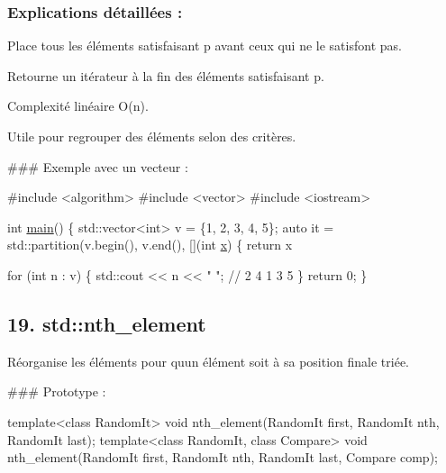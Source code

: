 \subsubsection*{Explications détaillées \+:}


\begin{DoxyItemize}
\item Place tous les éléments satisfaisant {\ttfamily p} avant ceux qui ne le satisfont pas.
\item Retourne un itérateur à la fin des éléments satisfaisant {\ttfamily p}.
\item Complexité linéaire O(n).
\item Utile pour regrouper des éléments selon des critères.
\end{DoxyItemize}

\#\#\# Exemple avec un vecteur \+: 
\begin{DoxyCode}
\textcolor{preprocessor}{#include <algorithm>}
\textcolor{preprocessor}{#include <vector>}
\textcolor{preprocessor}{#include <iostream>}

\textcolor{keywordtype}{int} \hyperlink{htop_8c_a3c04138a5bfe5d72780bb7e82a18e627}{main}() \{
    std::vector<int> v = \{1, 2, 3, 4, 5\};
    \textcolor{keyword}{auto} it = std::partition(v.begin(), v.end(), [](\textcolor{keywordtype}{int} \hyperlink{addition_8c_a6150e0515f7202e2fb518f7206ed97dc}{x}) \{ \textcolor{keywordflow}{return} x %

    \textcolor{keywordflow}{for} (\textcolor{keywordtype}{int} n : v) \{
        std::cout << n << \textcolor{stringliteral}{" "}; \textcolor{comment}{// 2 4 1 3 5}
    \}
    \textcolor{keywordflow}{return} 0;
\}
\end{DoxyCode}
 



\subsection*{19. {\bfseries std\+::nth\+\_\+element}}

Réorganise les éléments pour qu\textquotesingle{}un élément soit à sa position finale triée.

\#\#\# Prototype \+: 
\begin{DoxyCode}
\textcolor{keyword}{template}<\textcolor{keyword}{class} RandomIt>
\textcolor{keywordtype}{void} nth\_element(RandomIt first, RandomIt nth, RandomIt last);
\textcolor{keyword}{template}<\textcolor{keyword}{class} RandomIt, \textcolor{keyword}{class} Compare>
\textcolor{keywordtype}{void} nth\_element(RandomIt first, RandomIt nth, RandomIt last, Compare comp);
\end{DoxyCode}


